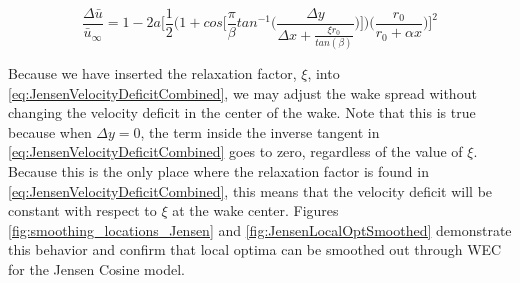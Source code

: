 \documentclass[a4paper]{jpconf}
\begin{document}



\begin{equation}
\frac{\Delta \bar{u}}{\bar{u}_\infty} = 1 - 2a \Bigg[ \frac{1}{2} \Bigg(1 + cos\Bigg[\frac{\pi}{\beta} tan^{-1}\Bigg(\frac{\Delta y}{\Delta x + \frac{\xi r_0}{tan(\beta)}} \Bigg) \Bigg] \Bigg) \bigg(\frac{r_0}{r_0 + \alpha x} \bigg) \Bigg]^2
\label{eq:JensenVelocityDeficitCombined}
\end{equation}

Because we have inserted the relaxation factor, $\xi$, into \cref{eq:JensenVelocityDeficitCombined}, we may adjust the wake spread without changing the velocity deficit in the center of the wake. Note that this is true because when $\Delta y = 0$, the term inside the inverse tangent in \cref{eq:JensenVelocityDeficitCombined} goes to zero, regardless of the value of $\xi$. Because this is the only place where the relaxation factor is found in \cref{eq:JensenVelocityDeficitCombined}, this means that the velocity deficit will be constant with respect to $\xi$ at the wake center. Figures \ref{fig:smoothing_locations_Jensen} and \ref{fig:JensenLocalOptSmoothed} demonstrate this behavior and confirm that local optima can be smoothed out through WEC for the Jensen Cosine model.
\end{document}
